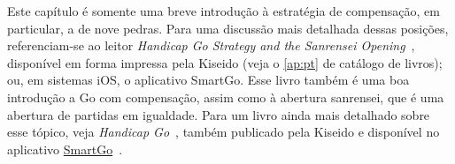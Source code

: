 \bigskip

Este capítulo é somente uma breve introdução à estratégia de compensação, em particular, a de nove pedras. Para uma discussão mais detalhada dessas posições, referenciam-se ao leitor \emph{Handicap Go Strategy and the Sanrensei Opening}~\cite{zeijst_bozulich_handicap_sanrensei}, disponível em forma impressa pela Kiseido (veja o \autoref{ap:pt} de catálogo de livros); ou, em sistemas iOS, o aplicativo SmartGo. Esse livro também é uma boa introdução a Go com compensação, assim como à abertura sanrensei, que é uma abertura de partidas em igualdade. Para um livro ainda mais detalhado sobre esse tópico, veja \emph{Handicap Go}~\cite{nagahara_bozulich_handicap_go}, também publicado pela Kiseido e disponível no aplicativo \href{apps.apple.com/us/app/smartgo-player/id314506629}{SmartGo}~\cite{smartgo}.